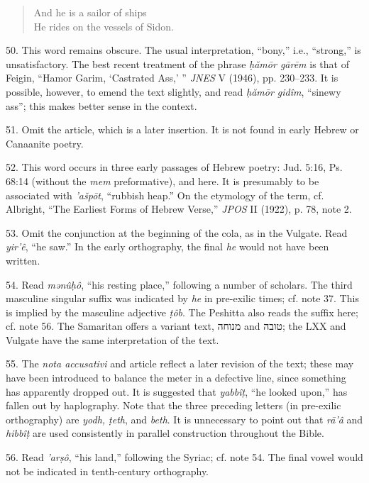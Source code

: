 \begin{enumerate}
\begin{quote}
And he is a sailor of ships\\
He rides on the vessels of Sidon.
\end{quote}

50. This word remains obscure. The usual interpretation, ``bony,'' i.e.,
``strong,'' is unsatisfactory. The best recent treatment of the phrase
\emph{ḥămōr gārēm} is that of Feigin, ``Hamor Garim, `Castrated Ass,' ''
\emph{JNES} V (1946), pp. 230--233. It is possible, however, to emend the text
slightly, and read \emph{ḥămōr gidîm}, ``sinewy ass''; this makes better sense
in the context.

51. Omit the article, which is a later insertion. It is not found in early
Hebrew or Canaanite poetry.

52. This word occurs in three early passages of Hebrew poetry: Jud. 5:16,
Ps. 68:14 (without the \emph{mem} preformative), and here. It is presumably to
be associated with \emph{'ašpōt}, ``rubbish heap.'' On the etymology of the
term, cf. Albright, ``The Earliest Forms of Hebrew Verse,'' \emph{JPOS} II
(1922), p. 78, note 2.

53. Omit the conjunction at the beginning of the cola, as in the Vulgate.
Read \emph{yir'ê}, ``he saw.'' In the early orthography, the final \emph{he}
would not have been written.

54. Read \emph{mənûḥô}, ``his resting place,'' following a number of scholars.
The third masculine singular suffix was indicated by \emph{he} in pre-exilic
times; cf. note 37. This is implied by the masculine adjective \emph{ṭôb}. The
Peshitta also reads the suffix here; cf. note 56. The Samaritan offers a
variant text, מנוחה and טובה; the LXX and Vulgate have the same interpretation
of the text.

55. The \emph{nota accusativi} and article reflect a later revision of the
text; these may have been introduced to balance the meter in a defective line,
since something has apparently dropped out. It is suggested that
\emph{yabbîṭ}, ``he looked upon,'' has fallen out by haplography. Note that the
three preceding letters (in pre-exilic orthography) are \emph{yodh, ṭeth}, and
\emph{beth}. It is unnecessary to point out that \emph{rā'â} and \emph{hibbîṭ}
are used consistently in parallel construction throughout the Bible.

56. Read \emph{'arṣô}, ``his land,'' following the Syriac; cf. note 54. The
final vowel would not be indicated in tenth-century orthography.


\end{enumerate}
